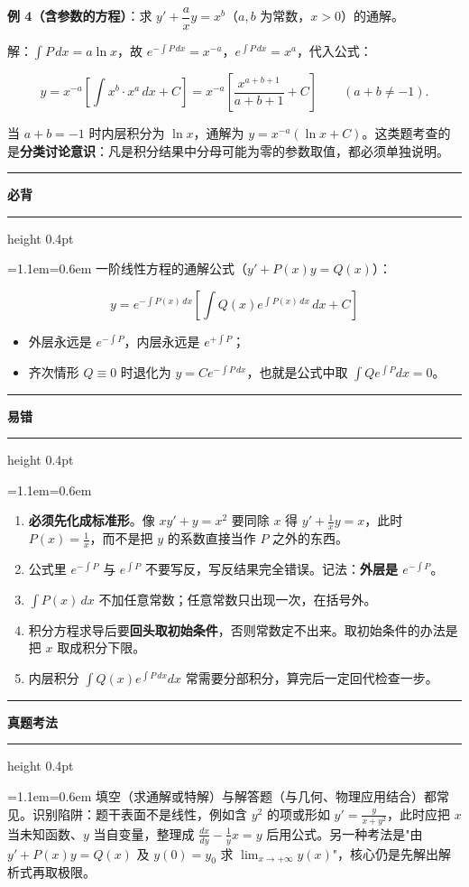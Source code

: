 \documentclass[11pt,openany,UTF8]{ctexbook}
\newcommand{\callouthead}[2]{%
  \par\addvspace{7pt}\noindent
  {\color{#1}\rule[-0.15em]{3pt}{1.05em}}\hspace{0.5em}%
  {\bfseries\color{#1}#2}\par\nobreak\vspace{-0.35em}%
  {\color{rulesep}\hrule height 0.4pt}\nobreak\vspace{0.45em}%
  \begingroup\small\setlength{\parindent}{0pt}%
  \leftskip=1.1em\rightskip=0.6em\noindent\ignorespaces}
\newcommand{\calloutend}{\par\endgroup\addvspace{7pt}}
\newenvironment{callkey}[1]{\callouthead{keybar}{#1}}{\calloutend}
\newenvironment{callwarn}[1]{\callouthead{warnbar}{#1}}{\calloutend}
\newenvironment{callexam}[1]{\callouthead{exambar}{#1}}{\calloutend}
\begin{document}
\textbf{例 4（含参数的方程）}：求 $y'+\dfrac{a}{x}y=x^{b}$（$a,b$ 为常数，$x>0$）的通解。

解：$\int P\,dx=a\ln x$，故 $e^{-\int P\,dx}=x^{-a}$，$e^{\int P\,dx}=x^{a}$，代入公式：

\[y=x^{-a}\left[\int x^{b}\cdot x^{a}\,dx+C\right]=x^{-a}\left[\frac{x^{a+b+1}}{a+b+1}+C\right]\qquad (a+b\ne -1).\]

当 $a+b=-1$ 时内层积分为 $\ln x$，通解为 $y=x^{-a}\left(\ln x+C\right)$。这类题考查的是\textbf{分类讨论意识}：凡是积分结果中分母可能为零的参数取值，都必须单独说明。

\begin{callkey}{必背}
一阶线性方程的通解公式（$y'+P(x)y=Q(x)$）：

\[y=e^{-\int P(x)\,dx}\left[\int Q(x)e^{\int P(x)\,dx}\,dx+C\right]\]

\begin{itemize}
\item 外层永远是 $e^{-\int P}$，内层永远是 $e^{+\int P}$；
\item 齐次情形 $Q\equiv 0$ 时退化为 $y=Ce^{-\int P\,dx}$，也就是公式中取 $\int Qe^{\int P}dx=0$。
\end{itemize}
\end{callkey}

\begin{callwarn}{易错}
\begin{enumerate}
\item \textbf{必须先化成标准形}。像 $xy'+y=x^{2}$ 要同除 $x$ 得 $y'+\frac1xy=x$，此时 $P(x)=\frac1x$，而不是把 $y$ 的系数直接当作 $P$ 之外的东西。
\item 公式里 $e^{-\int P}$ 与 $e^{\int P}$ 不要写反，写反结果完全错误。记法：\textbf{外层是 $e^{-\int P}$}。
\item $\int P(x)\,dx$ 不加任意常数；任意常数只出现一次，在括号外。
\item 积分方程求导后要\textbf{回头取初始条件}，否则常数定不出来。取初始条件的办法是把 $x$ 取成积分下限。
\item 内层积分 $\int Q(x)e^{\int P\,dx}dx$ 常需要分部积分，算完后一定回代检查一步。
\end{enumerate}
\end{callwarn}

\begin{callexam}{真题考法}
填空（求通解或特解）与解答题（与几何、物理应用结合）都常见。识别陷阱：题干表面不是线性，例如含 $y^{2}$ 的项或形如 $y'=\frac{y}{x+y^{2}}$，此时应把 $x$ 当未知函数、$y$ 当自变量，整理成 $\frac{dx}{dy}-\frac1yx=y$ 后用公式。另一种考法是"由 $y'+P(x)y=Q(x)$ 及 $y(0)=y_0$ 求 $\lim_{x\to+\infty}y(x)$"，核心仍是先解出解析式再取极限。

\end{callexam}
\end{document}
